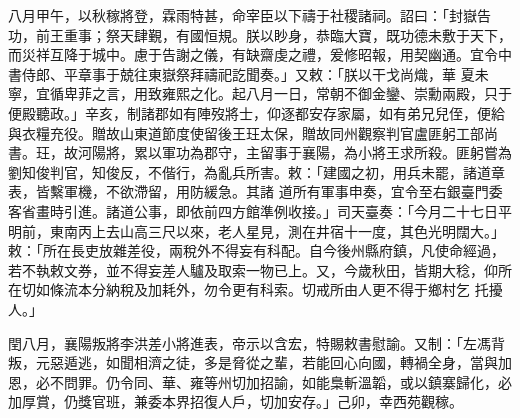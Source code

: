 \begin{pinyinscope}
 八月甲午，以秋稼將登，霖雨特甚，命宰臣以下禱于社稷諸祠。詔曰：「封嶽告功，前王重事；祭天肆覲，有國恒規。朕以眇身，恭臨大寶，既功德未敷于天下，而災祥互降于城中。慮于告謝之儀，有缺齋虔之禮，爰修昭報，用契幽通。宜令中書侍郎、平章事于兢往東嶽祭拜禱祀訖聞奏。」又敕：「朕以干戈尚熾，華
 夏未寧，宜循卑菲之言，用致雍熙之化。起八月一日，常朝不御金鑾、崇勳兩殿，只于便殿聽政。」辛亥，制諸郡如有陣歿將士，仰逐都安存家屬，如有弟兄兒侄，便給與衣糧充役。贈故山東道節度使留後王玨太保，贈故同州觀察判官盧匪躬工部尚書。玨，故河陽將，累以軍功為郡守，主留事于襄陽，為小將王求所殺。匪躬嘗為劉知俊判官，知俊反，不偕行，為亂兵所害。敕：「建國之初，用兵未罷，諸道章表，皆繫軍機，不欲滯留，用防緩急。其諸
 道所有軍事申奏，宜令至右銀臺門委客省畫時引進。諸道公事，即依前四方館準例收接。」司天臺奏：「今月二十七日平明前，東南丙上去山高三尺以來，老人星見，測在井宿十一度，其色光明闊大。」敕：「所在長吏放雜差役，兩稅外不得妄有科配。自今後州縣府鎮，凡使命經過，若不執敕文券，並不得妄差人驢及取索一物已上。又，今歲秋田，皆期大稔，仰所在切如條流本分納稅及加耗外，勿令更有科索。切戒所由人更不得于鄉村乞
 托擾人。」



 閏八月，襄陽叛將李洪差小將進表，帝示以含宏，特賜敕書慰諭。又制：「左馮背叛，元惡遁逃，如聞相濟之徒，多是脅從之輩，若能回心向國，轉禍全身，當與加恩，必不問罪。仍令同、華、雍等州切加招諭，如能梟斬溫韜，或以鎮寨歸化，必加厚賞，仍獎官班，兼委本界招復人戶，切加安存。」己卯，幸西苑觀稼。



\end{pinyinscope}
